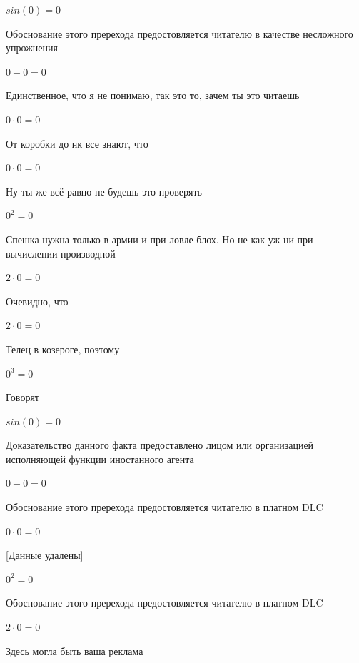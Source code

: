 \documentclass[12pt,a4paper,fleqn]{article}
\begin{document}
\begin{center}$sin(0) = 0$\end{center}
Обоснование этого пререхода предостовляется читателю в качестве несложного упрожнения

\begin{center}$0-0 = 0$\end{center}
Единственное, что я не понимаю, так это то, зачем ты это читаешь

\begin{center}$0 \cdot 0 = 0$\end{center}
От коробки до нк все знают, что

\begin{center}$0 \cdot 0 = 0$\end{center}
Ну ты же всё равно не будешь это проверять

\begin{center}$0^{2} = 0$\end{center}
Спешка нужна только в армии и при ловле блох. Но не как уж ни при вычислении производной\cite{link2}

\begin{center}$2 \cdot 0 = 0$\end{center}
Очевидно, что

\begin{center}$2 \cdot 0 = 0$\end{center}
Телец в козероге, поэтому

\begin{center}$0^{3} = 0$\end{center}
Говорят

\begin{center}$sin(0) = 0$\end{center}
Доказательство данного факта предоставлено лицом или организацией исполняющей функции иностанного агента

\begin{center}$0-0 = 0$\end{center}
Обоснование этого пререхода предостовляется читателю в платном DLC

\begin{center}$0 \cdot 0 = 0$\end{center}
[Данные удалены]

\begin{center}$0^{2} = 0$\end{center}
Обоснование этого пререхода предостовляется читателю в платном DLC

\begin{center}$2 \cdot 0 = 0$\end{center}
Здесь могла быть ваша реклама
\end{document}
